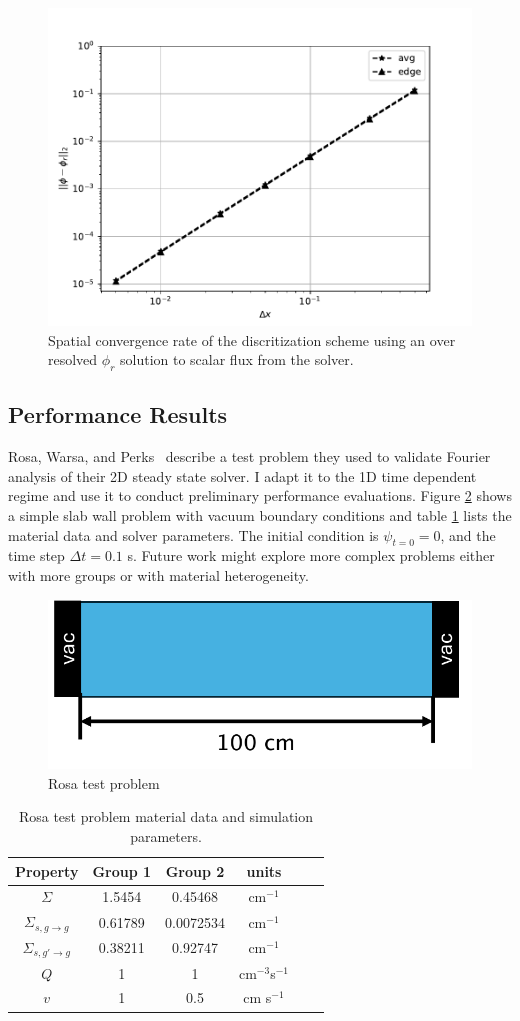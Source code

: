 \begin{figure}[h!]
    \centering
    \includegraphics[width=.5\textwidth]{figures/results/convergance_rate.pdf}
    \caption{Spatial convergence rate of the discritization scheme using an over resolved $\phi_r$ solution to scalar flux from the solver.}
    \label{fig:conv_rate}
\end{figure}


\subsection{Performance Results}

Rosa, Warsa, and Perks~\cite{rosa_cellwise_2013} describe a test problem they used to validate Fourier analysis of their 2D steady state solver.
I adapt it to the 1D time dependent regime and use it to conduct preliminary performance evaluations.
Figure \ref{fig:rosa_test} shows a simple slab wall problem with vacuum boundary conditions and table \ref{table:rosa_test} lists the material data and solver parameters.
The initial condition is $\psi_{t=0} = 0$, and the time step $\Delta t = 0.1$ s.
Future work might explore more complex problems either with more groups or with material heterogeneity.

\begin{figure}[h!]
    \centering
    \includegraphics[width=.4\textwidth]{figures/results/rtest.pdf}
    \caption{Rosa test problem}
    \label{fig:rosa_test}
\end{figure}

\begin{table}[!htb]
  \centering
  \caption{Rosa test problem material data and simulation parameters.}
  \begin{tabular}{c c c c c c  } \hline 
    Property & Group 1 & Group 2 & units \\ \hline
    $\Sigma$ & 1.5454 &  0.45468 & cm$^{-1}$  \\
    $\Sigma_{s,g\rightarrow g}$  & 0.61789 &  0.0072534 & cm$^{-1}$  \\
    $\Sigma_{s,g'\rightarrow g}$  & 0.38211 &  0.92747 & cm$^{-1}$ \\
    $Q$ & 1 & 1 & cm$^{-3}$s$^{-1}$\\
    $v$ & 1 & 0.5 & cm s$^{-1}$ \\
    \hline
  \end{tabular}
  \label{table:rosa_test} 
\end{table}


